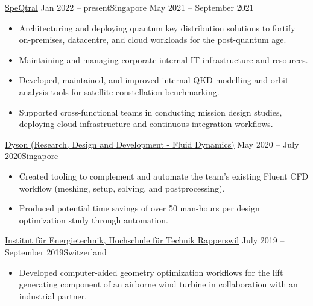 \documentclass[10.5pt,a4paper,ragged2e,withhyper]{altacv}
\begin{document}
\begin{paracol}{2}


  {\href{https://speqtral.space}{SpeQtral}}
  {Jan 2022 -- present}{Singapore}
  {}{May 2021 -- September 2021}{}
\begin{itemize}
\item Architecturing and deploying quantum key distribution solutions to fortify on-premises, datacentre, and cloud workloads for the post-quantum age.
\item Maintaining and managing corporate internal IT infrastructure and resources.
\item Developed, maintained, and improved internal QKD modelling and orbit analysis tools for satellite constellation benchmarking.
\item Supported cross-functional teams in conducting mission design studies, deploying cloud infrastructure and continuous integration workflows.
\end{itemize}

\divider

  {\href{https://careers.dyson.com/en-gb/what-you-can-do/engineer/research/}{Dyson (Research, Design and Development - Fluid Dynamics)}}
  {May 2020 -- July 2020}{Singapore}
\begin{itemize}
\item Created tooling to complement and automate the team's existing Fluent CFD workflow (meshing, setup, solving, and postprocessing).
\item Produced potential time savings of over 50 man-hours per design optimization study through automation.
\end{itemize}

\divider

  {\href{https://www.ost.ch/de/forschung-und-dienstleistungen/technik/erneuerbare-energien-und-umwelttechnik/iet-institut-fuer-energietechnik}{Institut für Energietechnik, Hochschule für Technik Rapperswil}}
  {July 2019 -- September 2019}{Switzerland}
\begin{itemize}
\item Developed computer-aided geometry optimization workflows for the lift generating component of an airborne wind turbine in collaboration with an industrial partner.
\end{itemize}


\end{paracol}
\end{document}
